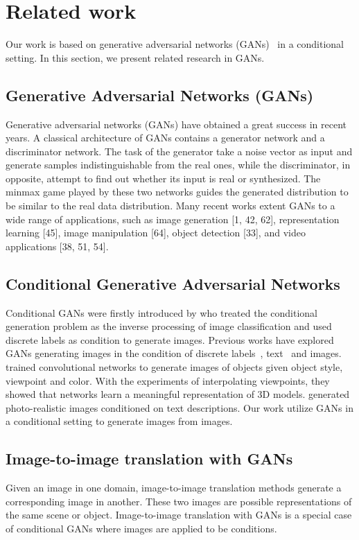 \section{Related work}
Our work is based on generative adversarial networks (GANs)~\cite{GAN} in a conditional setting. In this section, we present related research in GANs.
\subsection{Generative Adversarial Networks (GANs)}
Generative adversarial networks (GANs) \cite{GANs} have obtained a great success in recent years.
A classical architecture of GANs contains a generator network and a discriminator network. The task of the generator take a noise vector as input and generate samples indistinguishable from the real ones, while the discriminator, in opposite, attempt to find out whether its input is real or synthesized. The minmax game played by these two networks guides the generated distribution to be similar to the real data distribution. 
%
Many recent works extent GANs to a wide range of applications, such as image generation [1, 42, 62], representation learning [45], image manipulation [64], object detection [33], and video applications [38, 51, 54]. 

\subsection{Conditional Generative Adversarial Networks}
Conditional GANs were firstly introduced by \cite{CGAN} who treated the conditional generation problem as the inverse processing of image classification and used discrete labels as condition to generate images. Previous works have explored GANs generating images in the condition of discrete labels~\cite{CGAN}, text~\cite{Reed2016} and images.
%
\cite{Dosovitskiy2014} trained convolutional networks to generate images of objects given object style, viewpoint and color. With the experiments of interpolating viewpoints, they showed that networks learn a meaningful representation of 3D models. 
%
\cite{Reed2016} generated photo-realistic images conditioned on text descriptions. 
%
Our work utilize GANs in a conditional setting to generate images from images.


\subsection{Image-to-image translation with GANs}
Given an image in one domain, image-to-image translation methods generate a corresponding image in another. These two images are possible representations of the same scene or object. Image-to-image translation with GANs is a special case of conditional GANs where images are applied to be conditions. 
%

